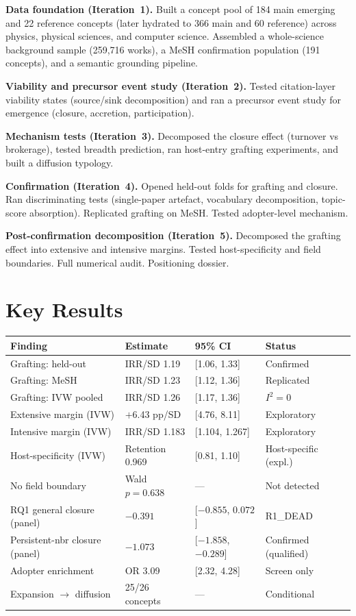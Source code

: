 \documentclass[11pt,letterpaper]{article}
\begin{document}
\textbf{Data foundation (Iteration~1).} Built a concept pool of 184 main emerging and 22 reference concepts (later hydrated to 366 main and 60 reference) across physics, physical sciences, and computer science. Assembled a whole-science background sample (259,716 works), a MeSH confirmation population (191 concepts), and a semantic grounding pipeline.

\textbf{Viability and precursor event study (Iteration~2).} Tested citation-layer viability states (source/sink decomposition) and ran a precursor event study for emergence (closure, accretion, participation).

\textbf{Mechanism tests (Iteration~3).} Decomposed the closure effect (turnover vs brokerage), tested breadth prediction, ran host-entry grafting experiments, and built a diffusion typology.

\textbf{Confirmation (Iteration~4).} Opened held-out folds for grafting and closure. Ran discriminating tests (single-paper artefact, vocabulary decomposition, topic-score absorption). Replicated grafting on MeSH. Tested adopter-level mechanism.

\textbf{Post-confirmation decomposition (Iteration~5).} Decomposed the grafting effect into extensive and intensive margins. Tested host-specificity and field boundaries. Full numerical audit. Positioning dossier.

\section*{Key Results}

\begin{table}[!htbp]
\centering
\small
\begin{tabular}{L{4.2cm}R{2.9cm}L{2.9cm}l}
\toprule
Finding & Estimate & 95\% CI & Status \\
\midrule
Grafting: held-out & IRR/SD 1.19 & [1.06, 1.33] & Confirmed \\
Grafting: MeSH & IRR/SD 1.23 & [1.12, 1.36] & Replicated \\
Grafting: IVW pooled & IRR/SD 1.26 & [1.17, 1.36] & $I^2 = 0$ \\
Extensive margin (IVW) & $+$6.43 pp/SD & [4.76, 8.11] & Exploratory \\
Intensive margin (IVW) & IRR/SD 1.183 & [1.104, 1.267] & Exploratory \\
Host-specificity (IVW) & Retention 0.969 & [0.81, 1.10] & Host-specific (expl.) \\
No field boundary & Wald $p = 0.638$ & --- & Not detected \\
RQ1 general closure (panel) & $-0.391$ & [$-0.855$, $0.072$] & R1\_DEAD \\
Persistent-nbr closure (panel) & $-1.073$ & [$-1.858$, $-0.289$] & Confirmed (qualified) \\
Adopter enrichment & OR 3.09 & [2.32, 4.28] & Screen only \\
Expansion $\to$ diffusion & 25/26 concepts & --- & Conditional \\
\bottomrule
\end{tabular}
\end{table}
\end{document}
